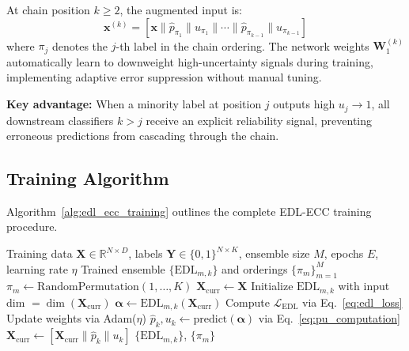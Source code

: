 \documentclass[conference]{IEEEtran}
\begin{document}
At chain position $k \geq 2$, the augmented input is:
\begin{equation}
    \mathbf{x}^{(k)} = [\mathbf{x} \| \hat{p}_{\pi_1} \| u_{\pi_1} \| \cdots \| \hat{p}_{\pi_{k-1}} \| u_{\pi_{k-1}}]
    \label{eq:feature_augmentation}
\end{equation}
where $\pi_j$ denotes the $j$-th label in the chain ordering. The network weights $\mathbf{W}_1^{(k)}$ automatically learn to downweight high-uncertainty signals during training, implementing adaptive error suppression without manual tuning.

\textbf{Key advantage:} When a minority label at position $j$ outputs high $u_j \to 1$, all downstream classifiers $k > j$ receive an explicit reliability signal, preventing erroneous predictions from cascading through the chain.

\subsection{Training Algorithm}

Algorithm~\ref{alg:edl_ecc_training} outlines the complete EDL-ECC training procedure.

\begin{algorithm}[t]
\caption{EDL-ECC Training Procedure}
\label{alg:edl_ecc_training}
\small
\begin{algorithmic}[1]
\Require Training data $\mathbf{X} \in \mathbb{R}^{N \times D}$, labels $\mathbf{Y} \in \{0,1\}^{N \times K}$, ensemble size $M$, epochs $E$, learning rate $\eta$
\Ensure Trained ensemble $\{\text{EDL}_{m,k}\}$ and orderings $\{\pi_m\}_{m=1}^M$
    \State $\pi_m \leftarrow \text{RandomPermutation}(1, \ldots, K)$
    \State $\mathbf{X}_{\text{curr}} \leftarrow \mathbf{X}$
        \State Initialize $\text{EDL}_{m,k}$ with input dim $= \dim(\mathbf{X}_{\text{curr}})$
            \State $\boldsymbol{\alpha} \leftarrow \text{EDL}_{m,k}(\mathbf{X}_{\text{curr}})$
            \State Compute $\mathcal{L}_{\text{EDL}}$ via Eq.~\eqref{eq:edl_loss}
            \State Update weights via Adam($\eta$)
        \EndFor
        \State $\hat{p}_k, u_k \leftarrow \text{predict}(\boldsymbol{\alpha})$ via Eq.~\eqref{eq:pu_computation}
        \State $\mathbf{X}_{\text{curr}} \leftarrow [\mathbf{X}_{\text{curr}} \| \hat{p}_k \| u_k]$
    \EndFor
\EndFor
\State \Return $\{\text{EDL}_{m,k}\}$, $\{\pi_m\}$
\end{algorithmic}
\end{algorithm}
\end{document}
